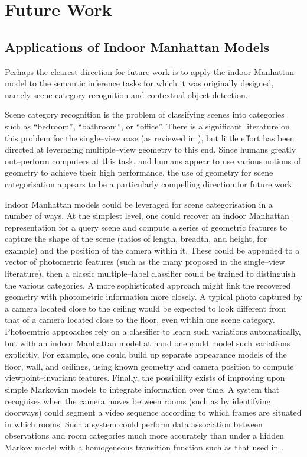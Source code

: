 \section{Future Work}

\subsection{Applications of Indoor Manhattan Models}

Perhaps the clearest direction for future work is to apply the indoor
Manhattan model to the semantic inference tasks for which it was
originally designed, namely scene category recognition and contextual
object detection.

Scene category recognition is the problem of classifying scenes into
categories such as ``bedroom'', ``bathroom'', or ``office''. There is
a significant literature on this problem for the single--view case (as
reviewed in ), but little effort has been directed at
leveraging multiple--view geometry to this end. Since humans greatly
out--perform computers at this task, and humans appear to use various
notions of geometry to achieve their high performance, the use of
geometry for scene categorisation appears to be a particularly
compelling direction for future work.

Indoor Manhattan models could be leveraged for scene categorisation in
a number of ways. At the simplest level, one could recover an indoor
Manhattan representation for a query scene and compute a series of
geometric features to capture the shape of the scene (ratios of
length, breadth, and height, for example) and the position of the
camera within it. These could be appended to a vector of photometric
features (such as the many proposed in the single--view literature),
then a classic multiple--label classifier could be trained to
distinguish the various categories. A more sophisticated approach
might link the recovered geometry with photometric information more
closely. A typical photo captured by a camera located close to the
ceiling would be expected to look different from that of a camera
located close to the floor, even within one scene
category. Photoemtric approaches rely on a classifier to learn such
variations automatically, but with an indoor Manhattan model at hand
one could model such variations explicitly. For example, one could
build up separate appearance models of the floor, wall, and ceilings,
using known geometry and camera position to compute
viewpoint--invariant features. Finally, the possibility exists of
improving upon simple Markovian models to integrate information over
time. A system that recognises when the camera moves between rooms
(such as by identifying doorways) could segment a video sequence
according to which frames are situated in which rooms. Such a system
could perform data association between observations and room
categories much more accurately than under a hidden Markov model with
a homogeneous transition function such as that used in
\cite{Torralba03}.

